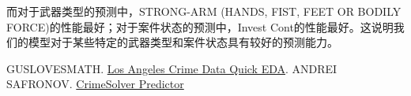 \documentclass{article}
\begin{document}
而对于武器类型的预测中，STRONG-ARM (HANDS, FIST, FEET OR BODILY FORCE)的性能最好；对于案件状态的预测中，Invest Cont的性能最好。这说明我们的模型对于某些特定的武器类型和案件状态具有较好的预测能力。

\begin{thebibliography}{99}
     GUSLOVESMATH. \href{https://www.kaggle.com/code/guslovesmath/los-angeles-crime-data-quick-eda}{Los Angeles Crime Data Quick EDA}.
     ANDREI SAFRONOV. \href{https://www.kaggle.com/code/safronov00/crimesolver-predictor#2.-Clean-Data}{CrimeSolver Predictor}
\end{thebibliography}
\end{document}
